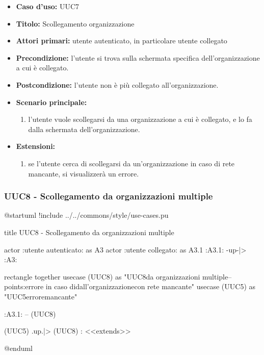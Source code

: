 \documentclass[casi-duso]{subfiles}
\begin{document}
\begin{itemize}
  \item \textbf{Caso d’uso:} UUC7
  \item \textbf{Titolo:} Scollegamento organizzazione
  \item \textbf{Attori primari:} utente autenticato, in particolare utente collegato
  \item \textbf{Precondizione:} l'utente si trova sulla schermata specifica dell'organizzazione a cui è collegato.
  \item \textbf{Postcondizione:} l'utente non è più collegato all'organizzazione.
  \item \textbf{Scenario principale:}
        \begin{enumerate}
          \item l'utente vuole scollegarsi da una organizzazione a cui è collegato, e lo fa dalla schermata dell'organizzazione.
        \end{enumerate}
  \item \textbf{Estensioni:}
        \begin{enumerate}
          \item se l'utente cerca di scollegarsi da un'organizzazione in caso di rete mancante, si visualizzerà un errore.
        \end{enumerate}
\end{itemize}

\subsubsection{UUC8 - Scollegamento da organizzazioni multiple}%
\label{subsub:UUC8utente}

\begin{plantuml}
@startuml
!include ../../commons/style/use-cases.pu

title UUC8 - Scollegamento da organizzazioni multiple

actor :utente autenticato: as A3
actor :utente collegato: as A3.1
:A3.1: -up-|> :A3:

rectangle {
  together {
    usecase (UUC8) as "UUC8\nScollegamento da organizzazioni multiple\n--\nExtension points:\nVisualizzazione errore in caso di\nscollegamento dall'organizzazione\n con rete mancante"
    usecase (UUC5) as "UUC5\nVisualizzazione errore\nrete mancante"
  }
}

:A3.1: -- (UUC8)

(UUC5) .up.|> (UUC8) : <<extends>>

@enduml
\end{plantuml}
\end{document}
